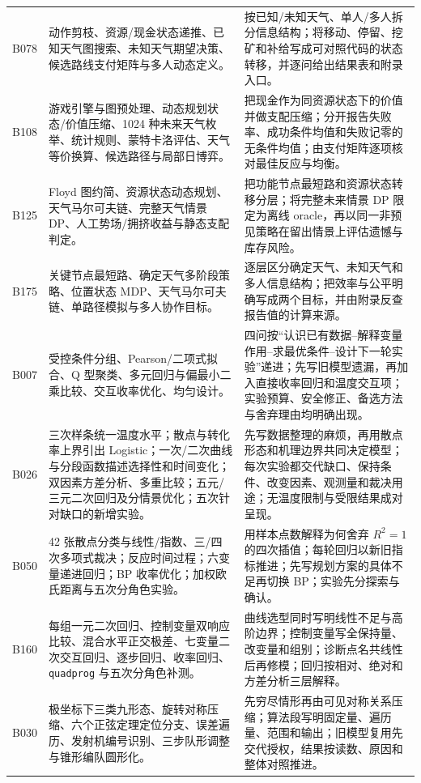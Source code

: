 \documentclass[UTF8,a4paper,12pt]{ctexart}
\begin{document}
\begin{longtable}{p{1.4cm}p{5.2cm}p{7.0cm}}
B078 & 动作剪枝、资源/现金状态递推、已知天气图搜索、未知天气期望决策、候选路线支付矩阵与多人动态定义。 &
按已知/未知天气、单人/多人拆分信息结构；将移动、停留、挖矿和补给写成可对照代码的状态转移，并逐问给出结果表和附录入口。\\
B108 & 游戏引擎与图预处理、动态规划状态/价值压缩、1024 种未来天气枚举、统计规则、蒙特卡洛评估、天气等价换算、候选路径与局部日博弈。 &
把现金作为同资源状态下的价值并做支配压缩；分开报告失败率、成功条件均值和失败记零的无条件均值；由支付矩阵逐项核对最佳反应与均衡。\\
B125 & Floyd 图约简、资源状态动态规划、天气马尔可夫链、完整天气情景 DP、人工势场/拥挤收益与静态支配判定。 &
把功能节点最短路和资源状态转移分层；将完整未来情景 DP 限定为离线 oracle，再以同一非预见策略在留出情景上评估遗憾与库存风险。\\
B175 & 关键节点最短路、确定天气多阶段策略、位置状态 MDP、天气马尔可夫链、单路径模拟与多人协作目标。 &
逐层区分确定天气、未知天气和多人信息结构；把效率与公平明确写成两个目标，并由附录反查报告值的计算来源。\\
B007 & 受控条件分组、Pearson/二项式拟合、Q 型聚类、多元回归与偏最小二乘比较、交互收率优化、均匀设计。 &
四问按“认识已有数据--解释变量作用--求最优条件--设计下一轮实验”递进；先写旧模型遗漏，再加入直接收率回归和温度交互项；实验预算、安全修正、备选方法与舍弃理由均明确出现。\\
B026 & 三次样条统一温度水平；散点与转化率上界引出 Logistic；一次/二次曲线与分段函数描述选择性和时间变化；双因素方差分析、多重比较；五元/三元二次回归及分情景优化；五次针对缺口的新增实验。 &
先写数据整理的麻烦，再用散点形态和机理边界共同决定模型；每次实验都交代缺口、保持条件、改变因素、观测量和裁决用途；无温度限制与受限结果成对呈现。\\
B050 & 42 张散点分类与线性/指数、三/四次多项式裁决；反应时间过程；六变量递进回归；BP 收率优化；加权欧氏距离与五次分角色实验。 &
用样本点数解释为何舍弃 $R^2=1$ 的四次插值；每轮回归以新旧指标推进；先写规划方案的具体不足再切换 BP；实验先分探索与确认。\\
B160 & 每组一元二次回归、控制变量双响应比较、混合水平正交极差、七变量二次交互回归、逐步回归、收率回归、\texttt{quadprog} 与五次分角色补测。 &
曲线选型同时写明线性不足与高阶边界；控制变量写全保持量、改变量和组别；诊断点名共线性后再修模；回归按相对、绝对和方差分析三层解释。\\
B030 & 极坐标下三类九形态、旋转对称压缩、六个正弦定理定位分支、误差遍历、发射机编号识别、三步队形调整与锥形编队圆形化。 &
先穷尽情形再由可见对称关系压缩；算法段写明固定量、遍历量、范围和输出；旧模型复用先交代授权，结果按读数、原因和整体对照推进。\\

\end{longtable}
\end{document}
